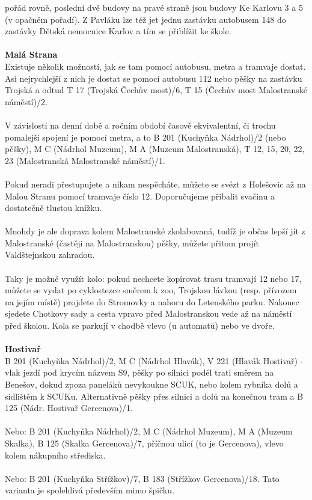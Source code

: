pořád rovně, poslední dvě budovy na pravé straně jsou budovy Ke Karlovu 3 a 5 (v
opačném pořadí). Z Pavláku lze též jet jednu zastávku autobusem 148 do zastávky
Dětská nemocnice Karlov a tím se přiblížit ke škole.
\\\\
\textbf{Malá Strana}\\
Existuje několik možností, jak se tam pomocí autobusu, metra a tramvaje dostat.
Asi nejrychlejší z nich je dostat se pomocí autobusu 112 nebo pěšky na zastávku
Trojská a odtud T 17 (Trojská \ra Čechův most)/6, T 15 (Čechův most \ra
Malostranské náměstí)/2.
\\\\
V závislosti na denní době a ročním období časově ekvivalentní, či trochu
pomalejší spojení je pomocí metra, a to B 201 (Kuchyňka \ra Nádrhol)/2 (nebo
pěšky), M C (Nádrhol \ra Muzeum), M A (Muzeum \ra Malostranská), T 12, 15, 20,
22, 23 (Malostranská \ra Malostranské náměstí)/1.
\\\\
Pokud neradi přestupujete a nikam nespěcháte, můžete se svézt z Holešovic až na
Malou Stranu pomocí tramvaje číslo 12. Doporučujeme přibalit svačinu a
dostatečně tlustou knížku.
\\\\
Mnohdy je ale doprava kolem Malostranské zkolabovaná, tudíž je občas lepší jít z
Malostranské (častěji na Malostranskou) pěšky, můžete přitom projít
Valdštejnskou zahradou.
\\\\
Taky je možné využít kolo: pokud nechcete kopírovat trasu tramvají 12 nebo 17,
můžete se vydat po cyklostezce směrem k zoo, Trojskou lávkou (resp. přívozem na
jejím místě) projdete do Stromovky a nahoru do Letenského parku. Nakonec sjedete
Chotkovy sady a cesta vpravo před Malostranskou vede až na náměstí před školou.
Kola se parkují v chodbě vlevo (u automatů) nebo ve dvoře.
\\\\
\textbf{Hostivař} \\
B 201 (Kuchyňka \ra Nádrhol)/2, M C (Nádrhol \ra Hlavák), V 221 (Hlavák \ra
Hostivař) - vlak jezdí pod krycím názvem S9, pěšky po silnici podél trati směrem
na Benešov, dokud zpoza paneláků nevykoukne SCUK, nebo kolem rybníka dolů a
sídlištěm k SCUKu. Alternativně pěšky přes silnici a dolů na konečnou tram a B
125 (Nádr. Hostivař \ra Gercenova)/1.
\\\\
Nebo: B 201 (Kuchyňka \ra Nádrhol)/2, M C (Nádrhol \ra Muzeum), M A (Muzeum \ra
Skalka), B 125 (Skalka \ra Gercenova)/7, příčnou ulicí (to je Gercenova), vlevo
kolem nákupního střediska.
\\\\
Nebo: B 201 (Kuchyňka \ra Střížkov)/7, B 183 (Střížkov \ra Gercenova)/18. Tato
varianta je spolehlivá především mimo špičku.

